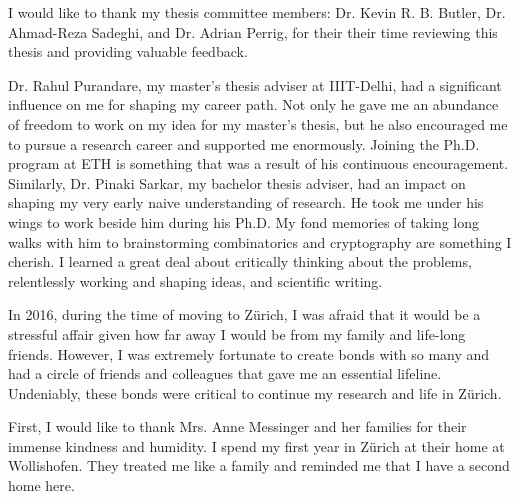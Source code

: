 I would like to thank my thesis committee members: Dr. Kevin R. B. Butler, Dr. Ahmad-Reza Sadeghi, and Dr. Adrian Perrig, for their their time reviewing this thesis and providing valuable feedback.


Dr. Rahul Purandare, my master's thesis adviser at IIIT-Delhi, had a significant influence on me for shaping my career path. Not only he gave me an abundance of freedom to work on my idea for my master's thesis, but he also encouraged me to pursue a research career and supported me enormously. Joining the Ph.D. program at ETH is something that was a result of his continuous encouragement. Similarly, Dr. Pinaki Sarkar, my bachelor thesis adviser, had an impact on shaping my very early naive understanding of research. He took me under his wings to work beside him during his Ph.D. My fond memories of taking long walks with him to brainstorming combinatorics and cryptography are something I cherish. I learned a great deal about critically thinking about the problems, relentlessly working and shaping ideas, and scientific writing.


In 2016, during the time of moving to Z\"urich, I was afraid that it would be a stressful affair given how far away I would be from my family and life-long friends. However, I was extremely fortunate to create bonds with so many and had a circle of friends and colleagues that gave me an essential lifeline. Undeniably, these bonds were critical to continue my research and life in Z\"urich. 


First, I would like to thank Mrs. Anne Messinger and her families for their immense kindness and humidity. I spend my first year in Z\"urich at their home at Wollishofen. They treated me like a family and reminded me that I have a second home here. 


